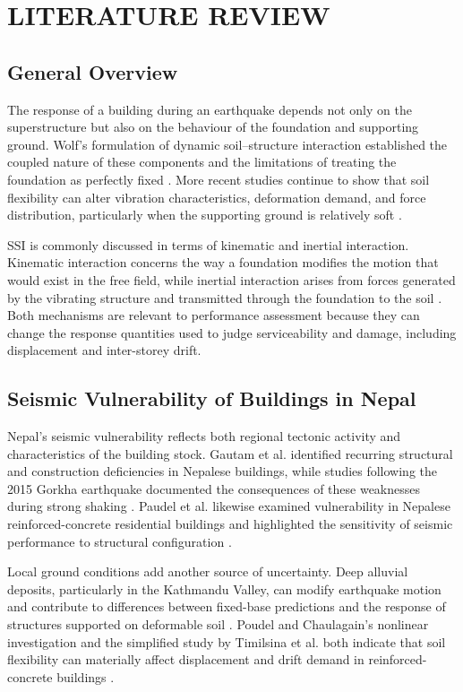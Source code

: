 \chapter{LITERATURE REVIEW}

\section{General Overview}
The response of a building during an earthquake depends not only on the superstructure but also on the behaviour of the foundation and supporting ground. Wolf's formulation of dynamic soil--structure interaction established the coupled nature of these components and the limitations of treating the foundation as perfectly fixed \cite{wolf1985}. More recent studies continue to show that soil flexibility can alter vibration characteristics, deformation demand, and force distribution, particularly when the supporting ground is relatively soft \cite{poudel2024,kc2025}.

SSI is commonly discussed in terms of kinematic and inertial interaction. Kinematic interaction concerns the way a foundation modifies the motion that would exist in the free field, while inertial interaction arises from forces generated by the vibrating structure and transmitted through the foundation to the soil \cite{wolf1985,kc2025}. Both mechanisms are relevant to performance assessment because they can change the response quantities used to judge serviceability and damage, including displacement and inter-storey drift.

\section{Seismic Vulnerability of Buildings in Nepal}
Nepal's seismic vulnerability reflects both regional tectonic activity and characteristics of the building stock. Gautam et al. identified recurring structural and construction deficiencies in Nepalese buildings, while studies following the 2015 Gorkha earthquake documented the consequences of these weaknesses during strong shaking \cite{gautam2016,adhikari2022}. Paudel et al. likewise examined vulnerability in Nepalese reinforced-concrete residential buildings and highlighted the sensitivity of seismic performance to structural configuration \cite{paudel2024seismic}.

Local ground conditions add another source of uncertainty. Deep alluvial deposits, particularly in the Kathmandu Valley, can modify earthquake motion and contribute to differences between fixed-base predictions and the response of structures supported on deformable soil \cite{poudel2024,adhikari2022}. Poudel and Chaulagain's nonlinear investigation and the simplified study by Timilsina et al. both indicate that soil flexibility can materially affect displacement and drift demand in reinforced-concrete buildings \cite{poudel2024,timilsina2023}.

